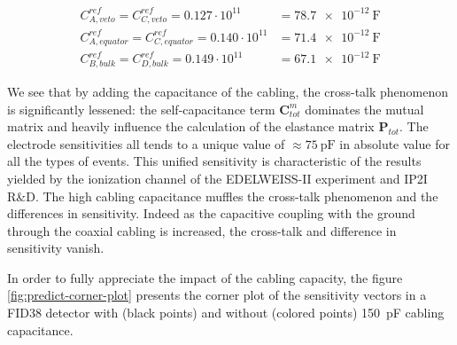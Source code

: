 \begin{align}
C_{A, veto}^{ref} = C_{C, veto}^{ref}
= 0.127 \cdot 10^{11}
&= \SI{78.7e-12}{\farad}
\\
C_{A, equator}^{ref} = C_{C, equator}^{ref}
= 0.140 \cdot 10^{11}
&= \SI{71.4e-12}{\farad}
\\
C_{B, bulk}^{ref} = C_{D, bulk}^{ref}
= 0.149 \cdot 10^{11}
&= \SI{67.1e-12}{\farad}
\end{align}

We see that by adding the capacitance of the cabling, the cross-talk phenomenon is significantly lessened: the self-capacitance term $\bm{C}^m_{tot}$ dominates the mutual matrix and heavily influence the calculation of the elastance matrix $\bm{P}_{tot}$. The electrode sensitivities all tends to a unique value of $\approx \SI{75}{\pico\farad}$ in absolute value for all the types of events. This unified sensitivity is characteristic of the results yielded by the ionization channel of the EDELWEISS-II experiment and IP2I R\&D. The high cabling capacitance muffles the cross-talk phenomenon and the differences in sensitivity. Indeed as the capacitive coupling with the ground through the coaxial cabling is increased, the cross-talk and difference in sensitivity vanish.

In order to fully appreciate the impact of the cabling capacity, the figure \ref{fig:predict-corner-plot} presents the corner plot of the sensitivity vectors in a FID38 detector with (black points) and without (colored points) \SI{150}{\pico\farad} cabling capacitance.

